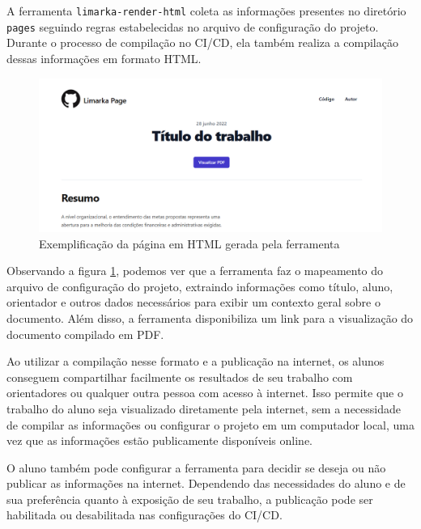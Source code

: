 \documentclass[
	12pt,				%
	oneside,			%
	a4paper,			%
	english,			%
	french,				%
	spanish,			%
	brazil				%
	]{abntex2}
\begin{document}
A ferramenta \texttt{limarka-render-html} coleta as informações
presentes no diretório \texttt{pages} seguindo regras estabelecidas no
arquivo de configuração do projeto. Durante o processo de compilação no
CI/CD, ela também realiza a compilação dessas informações em formato
HTML.

\begin{figure}[htbp]
\hypertarget{limarka_template_tcc_html}{%
\caption{Exemplificação da página em HTML gerada pela ferramenta}\label{limarka_template_tcc_html}
\begin{center}
\includegraphics[scale=0.4]{imagens/screenshot/limarka-template-tcc-html.png}
\end{center}
}
\end{figure}

Observando a figura \ref{limarka_template_tcc_html}, podemos ver que a
ferramenta faz o mapeamento do arquivo de configuração do projeto,
extraindo informações como título, aluno, orientador e outros dados
necessários para exibir um contexto geral sobre o documento. Além disso,
a ferramenta disponibiliza um link para a visualização do documento
compilado em PDF.

Ao utilizar a compilação nesse formato e a publicação na internet, os
alunos conseguem compartilhar facilmente os resultados de seu trabalho
com orientadores ou qualquer outra pessoa com acesso à internet. Isso
permite que o trabalho do aluno seja visualizado diretamente pela
internet, sem a necessidade de compilar as informações ou configurar o
projeto em um computador local, uma vez que as informações estão
publicamente disponíveis online.

O aluno também pode configurar a ferramenta para decidir se deseja ou
não publicar as informações na internet. Dependendo das necessidades do
aluno e de sua preferência quanto à exposição de seu trabalho, a
publicação pode ser habilitada ou desabilitada nas configurações do
CI/CD.
\end{document}

